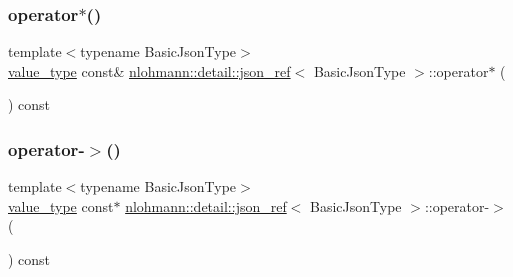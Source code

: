 \mbox{\label{classnlohmann_1_1detail_1_1json__ref_aa3100e41472dba02ab78ccc1607e44ab}} 
\subsubsection{\texorpdfstring{operator$\ast$()}{operator*()}}
{\footnotesize\ttfamily template$<$typename Basic\+Json\+Type$>$ \\
\hyperlink{classnlohmann_1_1detail_1_1json__ref_a78d76cf288141049568c0d670ed670ef}{value\+\_\+type} const\& \hyperlink{classnlohmann_1_1detail_1_1json__ref}{nlohmann\+::detail\+::json\+\_\+ref}$<$ Basic\+Json\+Type $>$\+::operator$\ast$ (\begin{DoxyParamCaption}{ }\end{DoxyParamCaption}) const\hspace{0.3cm}{\ttfamily [inline]}}

\mbox{\label{classnlohmann_1_1detail_1_1json__ref_adb652774a67829876449dc0b30637456}} 
\subsubsection{\texorpdfstring{operator-\/$>$()}{operator->()}}
{\footnotesize\ttfamily template$<$typename Basic\+Json\+Type$>$ \\
\hyperlink{classnlohmann_1_1detail_1_1json__ref_a78d76cf288141049568c0d670ed670ef}{value\+\_\+type} const$\ast$ \hyperlink{classnlohmann_1_1detail_1_1json__ref}{nlohmann\+::detail\+::json\+\_\+ref}$<$ Basic\+Json\+Type $>$\+::operator-\/$>$ (\begin{DoxyParamCaption}{ }\end{DoxyParamCaption}) const\hspace{0.3cm}{\ttfamily [inline]}}

\mbox{\label{classnlohmann_1_1detail_1_1json__ref_a98956ba676b1ae16b62346f9c4fb752e}} 
